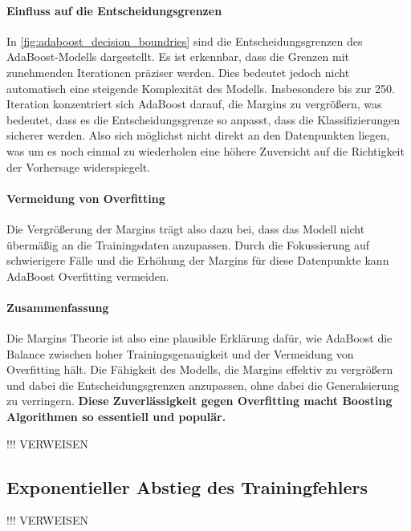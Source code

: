 \paragraph{Einfluss auf die Entscheidungsgrenzen}
In \autoref{fig:adaboost_decision_boundries} sind die Entscheidungsgrenzen des AdaBoost-Modells dargestellt. Es ist erkennbar, dass die Grenzen mit zunehmenden Iterationen präziser werden. Dies bedeutet jedoch nicht automatisch eine steigende Komplexität des Modells. Insbesondere bis zur 250. Iteration konzentriert sich AdaBoost darauf, die Margins zu vergrößern, was bedeutet, dass es die Entscheidungsgrenze so anpasst, dass die Klassifizierungen sicherer werden. Also sich möglichst nicht direkt an den Datenpunkten liegen, was um es noch einmal zu wiederholen eine höhere Zuversicht auf die Richtigkeit der Vorhersage widerspiegelt.

\paragraph{Vermeidung von Overfitting}
Die Vergrößerung der Margins trägt also dazu bei, dass das Modell nicht übermäßig an die Trainingsdaten anzupassen. Durch die Fokussierung auf schwierigere Fälle und die Erhöhung der Margins für diese Datenpunkte kann AdaBoost Overfitting vermeiden. 

\paragraph{Zusammenfassung}
Die Margins Theorie ist also eine plausible Erklärung dafür, wie AdaBoost die Balance zwischen hoher Trainingsgenauigkeit und der Vermeidung von Overfitting hält. Die Fähigkeit des Modells, die Margins effektiv zu vergrößern und dabei die Entscheidungsgrenzen anzupassen, ohne dabei die Generalsierung zu verringern. \textbf{Diese Zuverlässigkeit gegen Overfitting macht Boosting Algorithmen so essentiell und populär.}

!!! VERWEISEN

\subsection{Exponentieller Abstieg des Trainingfehlers}
!!! VERWEISEN